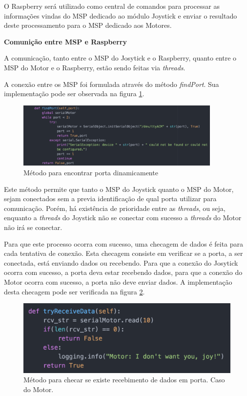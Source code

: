   O Raspberry será utilizado como central de comandos para processar as informações vindas do MSP dedicado ao módulo Joystick e enviar o resultado deste processamento para o MSP dedicado aos Motores.

  \textbf{Comunição entre MSP e Raspberry}

  A comunicação, tanto entre o MSP do Josytick e o Raspberry, quanto entre o MSP do Motor e o Raspberry, estão sendo feitas via \textit{threads}.

  A conexão entre os MSP foi formulada através do método \textit{findPort}. Sua implementação pode ser observada na figura \ref{fig:find_port_method}.

  \begin{figure}[!htb]
    \centering
    \includegraphics[width=0.9\textwidth]{figuras/resultados/find_port_method}
    \caption{Método para encontrar porta dinamicamente}
    \label{fig:find_port_method}
  \end{figure}

  Este método permite que tanto o MSP do Joystick quanto o MSP do Motor, sejam conectados sem a previa identificação de qual porta utilizar para comunicação. Porém, há existência de prioridade entre as \textit{threads}, ou seja, enquanto a \textit{threads} do Joystick não se conectar com sucesso a \textit{threads} do Motor não irá se conectar.

  Para que este processo ocorra com sucesso, uma checagem de dados é feita para cada tentativa de conexão. Esta checagem consiste em verificar se a porta, a ser conectada, está enviando dados ou recebendo. Para que a conexão do Josytick ocorra com sucesso, a porta deva estar recebendo dados, para que a conexão do Motor ocorra com sucesso, a porta não deve enviar dados. A implementação desta checagem pode ser verificada na figura \ref{fig:try_receive_data}.

  \begin{figure}[!htb]
  \centering
  \includegraphics[keepaspectratio=true,scale=0.5]{figuras/resultados/try_receive_data}
  \caption{Método para checar se existe recebimento de dados em porta. Caso do Motor.}
  \label{fig:try_receive_data}
  \end{figure}

